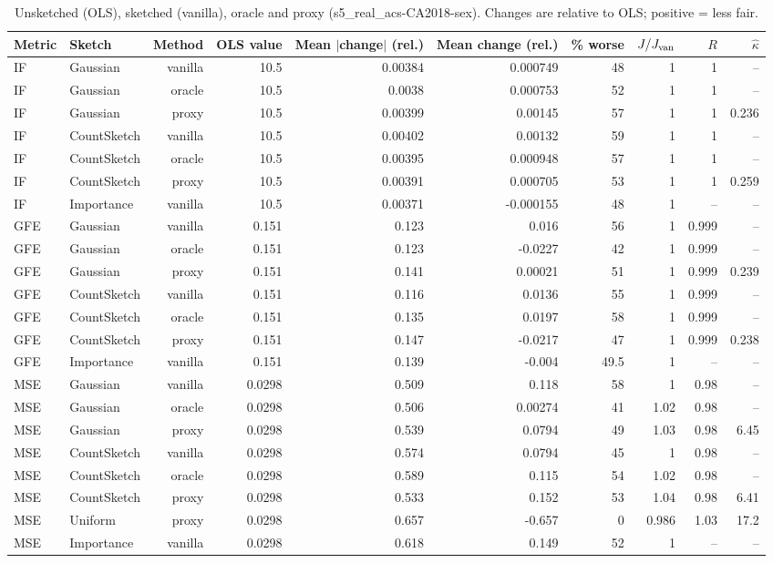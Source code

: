 \begin{table}[t]
\centering
\small
\begin{tabular}{llrrrrrrrr}
\toprule
Metric & Sketch & Method & OLS value & Mean $|$change$|$ (rel.) & Mean change (rel.) & \% worse & $J/J_{\rm van}$ & $R$ & $\hat\kappa$ \\
\midrule
IF & Gaussian & vanilla & 10.5 & 0.00384 & 0.000749 & 48 & 1 & 1 & -- \\
IF & Gaussian & oracle & 10.5 & 0.0038 & 0.000753 & 52 & 1 & 1 & -- \\
IF & Gaussian & proxy & 10.5 & 0.00399 & 0.00145 & 57 & 1 & 1 & 0.236 \\
IF & CountSketch & vanilla & 10.5 & 0.00402 & 0.00132 & 59 & 1 & 1 & -- \\
IF & CountSketch & oracle & 10.5 & 0.00395 & 0.000948 & 57 & 1 & 1 & -- \\
IF & CountSketch & proxy & 10.5 & 0.00391 & 0.000705 & 53 & 1 & 1 & 0.259 \\
IF & Importance & vanilla & 10.5 & 0.00371 & -0.000155 & 48 & 1 & -- & -- \\
\midrule
GFE & Gaussian & vanilla & 0.151 & 0.123 & 0.016 & 56 & 1 & 0.999 & -- \\
GFE & Gaussian & oracle & 0.151 & 0.123 & -0.0227 & 42 & 1 & 0.999 & -- \\
GFE & Gaussian & proxy & 0.151 & 0.141 & 0.00021 & 51 & 1 & 0.999 & 0.239 \\
GFE & CountSketch & vanilla & 0.151 & 0.116 & 0.0136 & 55 & 1 & 0.999 & -- \\
GFE & CountSketch & oracle & 0.151 & 0.135 & 0.0197 & 58 & 1 & 0.999 & -- \\
GFE & CountSketch & proxy & 0.151 & 0.147 & -0.0217 & 47 & 1 & 0.999 & 0.238 \\
GFE & Importance & vanilla & 0.151 & 0.139 & -0.004 & 49.5 & 1 & -- & -- \\
\midrule
MSE & Gaussian & vanilla & 0.0298 & 0.509 & 0.118 & 58 & 1 & 0.98 & -- \\
MSE & Gaussian & oracle & 0.0298 & 0.506 & 0.00274 & 41 & 1.02 & 0.98 & -- \\
MSE & Gaussian & proxy & 0.0298 & 0.539 & 0.0794 & 49 & 1.03 & 0.98 & 6.45 \\
MSE & CountSketch & vanilla & 0.0298 & 0.574 & 0.0794 & 45 & 1 & 0.98 & -- \\
MSE & CountSketch & oracle & 0.0298 & 0.589 & 0.115 & 54 & 1.02 & 0.98 & -- \\
MSE & CountSketch & proxy & 0.0298 & 0.533 & 0.152 & 53 & 1.04 & 0.98 & 6.41 \\
MSE & Uniform & proxy & 0.0298 & 0.657 & -0.657 & 0 & 0.986 & 1.03 & 17.2 \\
MSE & Importance & vanilla & 0.0298 & 0.618 & 0.149 & 52 & 1 & -- & -- \\
\bottomrule
\end{tabular}
\caption{Unsketched (OLS), sketched (vanilla), oracle and proxy (s5_real_acs-CA2018-sex). Changes are relative to OLS; positive = less fair.}
\label{tab:strat_s5_real_acs-CA2018-sex}
\end{table}